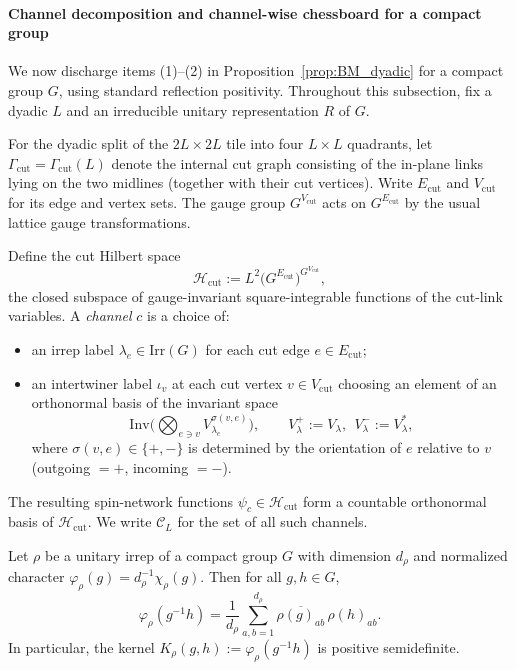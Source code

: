 
\paragraph{Channel decomposition and channel-wise chessboard for a compact group}\label{sec:BM_channel_closure_G}

We now discharge items (1)--(2) in Proposition~\ref{prop:BM_dyadic} for a compact group $G$, using standard reflection positivity.
Throughout this subsection, fix a dyadic $L$ and an irreducible unitary representation $R$ of $G$.
\begin{definition}\label{def:BM_cut_graph_channels}
For the dyadic split of the $2L\times 2L$ tile into four $L\times L$ quadrants, let $\Gamma_{\mathrm{cut}}=\Gamma_{\mathrm{cut}}(L)$ denote
the internal cut graph consisting of the in-plane links lying on the two midlines (together with their cut vertices).
Write $E_{\mathrm{cut}}$ and $V_{\mathrm{cut}}$ for its edge and vertex sets. The gauge group $G^{V_{\mathrm{cut}}}$ acts on
$G^{E_{\mathrm{cut}}}$ by the usual lattice gauge transformations.

Define the cut Hilbert space
\[
\mathcal H_{\mathrm{cut}}:=L^2\!\big(G^{E_{\mathrm{cut}}}\big)^{G^{V_{\mathrm{cut}}}},
\]
the closed subspace of gauge-invariant square-integrable functions of the cut-link variables.
A \emph{channel} $c$ is a choice of:
\begin{itemize}
\item an irrep label $\lambda_e\in\mathrm{Irr}(G)$ for each cut edge $e\in E_{\mathrm{cut}}$;
\item an intertwiner label $\iota_v$ at each cut vertex $v\in V_{\mathrm{cut}}$ choosing an element of an orthonormal basis of the invariant space
\[
\mathrm{Inv}\!\Big(\bigotimes_{e\ni v} V_{\lambda_e}^{\sigma(v,e)}\Big),
\qquad
V_{\lambda}^{+}:=V_{\lambda},\ \ V_{\lambda}^{-}:=V_{\lambda}^{\ast},
\]
where $\sigma(v,e)\in\{+,-\}$ is determined by the orientation of $e$ relative to $v$ (outgoing $=+$, incoming $=-$).
\end{itemize}
The resulting spin-network functions $\psi_c\in\mathcal H_{\mathrm{cut}}$ form a countable orthonormal basis of $\mathcal H_{\mathrm{cut}}$. We write $\mathcal C_L$ for the set of all such channels.
\end{definition}

\begin{lemma}\label{lem:BM_char_pos_type_G}
Let $\rho$ be a unitary irrep of a compact group $G$ with dimension $d_\rho$ and normalized character
$\varphi_\rho(g)=d_\rho^{-1}\chi_\rho(g)$.
Then for all $g,h\in G$,
\begin{equation}\label{eq:BM_char_pos_type}
\varphi_\rho(g^{-1}h)=\frac{1}{d_\rho}\sum_{a,b=1}^{d_\rho}\overline{\rho(g)_{ab}}\,\rho(h)_{ab}.
\end{equation}
In particular, the kernel $K_\rho(g,h):=\varphi_\rho(g^{-1}h)$ is positive semidefinite.
\end{lemma}

